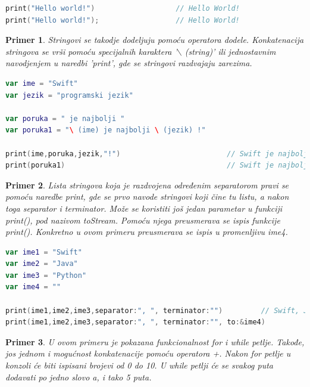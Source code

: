 \documentclass[a4paper]{article}
\newtheorem{primer}{Primer}[section]
\begin{document}
\begin{lstlisting}[language=Swift, caption={Ispis teksta},frame=single, label=simple]
print("Hello world!")				    // Hello World!
print("Hello world!");					// Hello World!
\end{lstlisting}

\begin{primer}
Stringovi se takodje dodeljuju pomoću operatora dodele. Konkatenacija stringova se vrši pomoću specijalnih karaktera '$\backslash$ (string)' ili jednostavnim navodjenjem u naredbi 'print', gde se stringovi razdvajaju zarezima.
\end{primer}

\begin{lstlisting}[language=Swift, caption={Stringovi i konkatenacija stringova},frame=single, label=simple]
var ime = "Swift"
var jezik = "programski jezik"

var poruka = " je najbolji "
var poruka1 = "\ (ime) je najbolji \ (jezik) !" 

print(ime,poruka,jezik,"!") 						// Swift je najbolji progmski jezik
print(poruka1)										// Swift je najbolji progmski jezik
\end{lstlisting}

\begin{primer}
Lista stringova koja je razdvojena određenim separatorom pravi se pomoću naredbe print, gde se prvo navode stringovi koji čine tu listu, a nakon toga separator i terminator. Može se koristiti još jedan parametar u funkciji print(), pod nazivom toStream. Pomoću njega preusmerava se ispis funkcije print(). Konkretno u ovom primeru preusmerava se ispis u promenljivu ime4.
\end{primer}

\begin{lstlisting}[language=Swift, caption={Lista stringova},frame=single, label=simple]
var ime1 = "Swift"
var ime2 = "Java"
var ime3 = "Python"
var ime4 = ""

print(ime1,ime2,ime3,separator:", ", terminator:"") 		// Swift, Java, Python
print(ime1,ime2,ime3,separator:", ", terminator:"", to:&ime4)
\end{lstlisting}

\begin{primer}
U ovom primeru je pokazana funkcionalnost for i while petlje. Takođe, jos jednom i mogućnost konkatenacije pomoću operatora +. Nakon for petlje u konzoli će biti ispisani brojevi od 0 do 10. U while petlji će se svakog puta dodavati po jedno slovo a, i tako 5 puta.
\end{primer}
\end{document}
